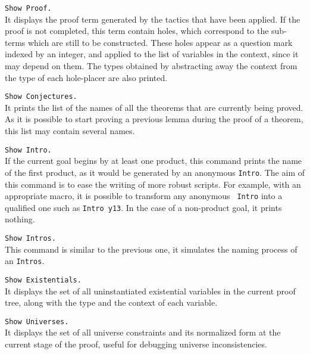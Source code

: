 \begin{Variants}
\item {\tt Show Proof.}\\
It displays the proof term generated by the 
tactics that have been applied. 
If the proof is not completed, this term contain holes,
which correspond to the sub-terms which are still to be 
constructed. These holes appear as a question mark indexed 
by an integer, and applied to the list of variables in 
the context, since it may depend on them. 
The types obtained by abstracting away the context from the
type of each hole-placer are also printed.

\item {\tt Show Conjectures.}\\
It prints the list of the names of all the theorems that 
are currently being proved.
As it is possible to start proving a previous lemma during
the proof of a theorem, this list may contain several 
names. 

\item{\tt Show Intro.}\\
If the current goal begins by at least one product, this command
prints the name of the first product, as it would be generated by 
an anonymous {\tt Intro}. The aim of this command is to ease the
writing of more robust scripts. For example, with an appropriate 
{\ProofGeneral} macro, it is possible to transform any anonymous {\tt
  Intro} into a qualified one such as {\tt Intro y13}.
In the case of a non-product goal, it prints nothing. 

\item{\tt Show Intros.}\\
This command is similar to the previous one, it simulates the naming 
process of an {\tt Intros}.

\item{\tt Show Existentials.\label{ShowExistentials}}
\\ It displays
the set of all uninstantiated existential variables in the current proof tree, 
along with the type and the context of each variable.

\item{\tt Show Universes.\label{ShowUniverses}}
\\ It displays the set of all universe constraints and its
normalized form at the current stage of the proof, useful for
debugging universe inconsistencies.

\end{Variants}


